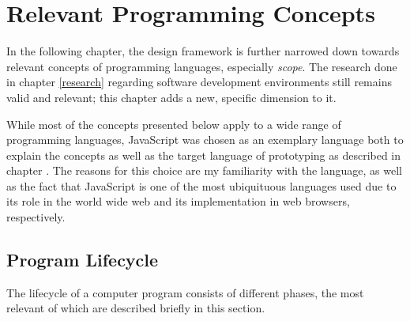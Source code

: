 \chapter{Relevant Programming Concepts}\label{concepts}

In the following chapter, the design framework is further narrowed down
towards relevant concepts of programming languages, especially
\emph{scope}. The research done in chapter \ref{research} regarding
software development environments still remains valid and relevant; this
chapter adds a new, specific dimension to it.

While most of the concepts presented below apply to a wide range of
programming languages, JavaScript was chosen as an exemplary language
both to explain the concepts as well as the target language of
prototyping as described in chapter . The reasons for
this choice are my familiarity with the language, as well as the fact
that JavaScript is one of the most ubiquituous languages used due to its
role in the world wide web and its implementation in web browsers,
respectively.

\section{Program Lifecycle}\label{program-lifecycle}

The lifecycle of a computer program consists of different phases, the
most relevant of which are described briefly in this section.

